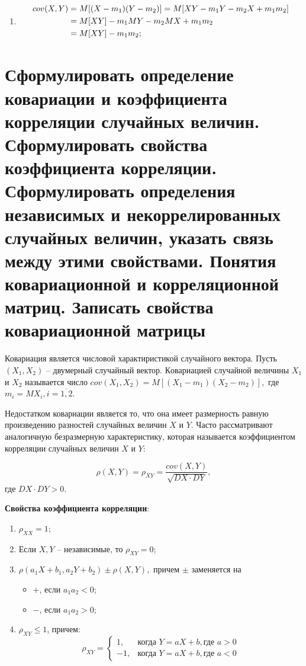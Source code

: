 \begin{enumerate}
\item
\begin{align}
	cov(X, Y) &=  M[(X - m_1)(Y-m_2)] = M[XY - m_1Y - m_2X + m_1m_2] \notag \\
	&= M[XY] - m_1MY - m_2MX + m_1m_2 \notag \\
	&= M[XY] - m_1m_2 \notag;
\end{align}

\end{enumerate}

\section{Сформулировать определение ковариации и коэффициента корреляции случайных величин. Сформулировать свойства коэффициента корреляции. Сформулировать определения независимых и некоррелированных случайных величин, указать связь между этими свойствами. Понятия ковариационной и корреляционной матриц. Записать свойства ковариационной матрицы}

Ковариация является числовой характиристикой случайного вектора. Пусть $(X_1, X_2)$ -- двумерный случайный вектор. $Ковариацией$ случайной величины $X_1$ и $X_2$ называется число $cov(X_1, X_2) = M[(X_1 - m_1)(X_2 - m_2)],$ где $m_i = MX_i, i = \overline{1, 2}$.

Недостатком ковариации является то, что она имеет размерность равную произведению разностей случайных величин $X$ и $Y$. Часто рассматривают аналогичную безразмерную характеристику, которая называется коэффициентом корреляции случайных величин $X$ и $Y$:

\[
\rho(X, Y) = \rho_{XY} = \frac{cov(X, Y)}{\sqrt{DX \cdot DY}},
\] 
где $DX \cdot DY > 0$.

\textbf{Свойства коэффициента корреляции}:
\begin{enumerate}
\item $\rho_{XX} = 1$;
\item Если $X, Y$ -- независимые, то $\rho_{XY} = 0$;
\item $\rho(a_1X + b_1, a_2Y + b_2) \pm \rho(X, Y),$ причем $\pm$ заменяется на
\begin{itemize}
	\item $+$, если $a_1a_2 < 0$;
	\item $-$, если $a_1a_2 > 0$;
\end{itemize}
\item $\rho_{XY} \leq 1$, причем:
\[
\rho_{XY} =
\begin{cases} 
	1, & \text{когда } Y = aX + b, \text{где } a > 0 \\
	-1, & \text{когда } Y = aX + b, \text{где } a < 0
\end{cases}
\]
\end{enumerate}

